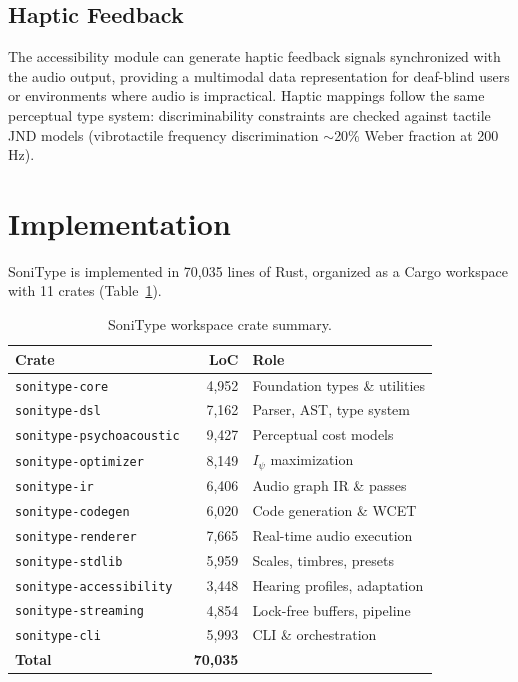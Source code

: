 \documentclass[sigchi, nonacm]{acmart}
\begin{document}
\subsection{Haptic Feedback}

The accessibility module can generate haptic feedback signals synchronized with the audio output, providing a multimodal data representation for deaf-blind users or environments where audio is impractical. Haptic mappings follow the same perceptual type system: discriminability constraints are checked against tactile JND models (vibrotactile frequency discrimination $\sim$20\% Weber fraction at 200 Hz).

\section{Implementation}
\label{sec:implementation}

SoniType is implemented in 70,035 lines of Rust, organized as a Cargo workspace with 11 crates (Table~\ref{tab:crates}).

\begin{table}[t]
\centering
\caption{SoniType workspace crate summary.}
\label{tab:crates}
\small
\begin{tabular}{lrl}
\toprule
\textbf{Crate} & \textbf{LoC} & \textbf{Role} \\
\midrule
\texttt{sonitype-core} & 4,952 & Foundation types \& utilities \\
\texttt{sonitype-dsl} & 7,162 & Parser, AST, type system \\
\texttt{sonitype-psychoacoustic} & 9,427 & Perceptual cost models \\
\texttt{sonitype-optimizer} & 8,149 & $I_\psi$ maximization \\
\texttt{sonitype-ir} & 6,406 & Audio graph IR \& passes \\
\texttt{sonitype-codegen} & 6,020 & Code generation \& WCET \\
\texttt{sonitype-renderer} & 7,665 & Real-time audio execution \\
\texttt{sonitype-stdlib} & 5,959 & Scales, timbres, presets \\
\texttt{sonitype-accessibility} & 3,448 & Hearing profiles, adaptation \\
\texttt{sonitype-streaming} & 4,854 & Lock-free buffers, pipeline \\
\texttt{sonitype-cli} & 5,993 & CLI \& orchestration \\
\midrule
\textbf{Total} & \textbf{70,035} & \\
\bottomrule
\end{tabular}
\end{table}
\end{document}
